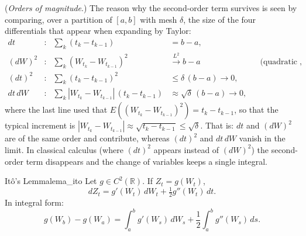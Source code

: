 \documentclass[11pt, a4paper]{article}
\begin{document}
\obs (\emph{Orders of magnitude}.) The reason why the second-order term survives is seen by
comparing, over a partition of $[a, b]$ with mesh $\delta$, the size of the four
differentials that appear when expanding by Taylor:
\begin{align*}
dt &: & \sum_k (t_k - t_{k-1}) &= b - a, \\
(dW)^2 &: & \sum_k (W_{t_k} - W_{t_{k-1}})^2 &\xrightarrow{L^2} b - a
&& \text{(quadratic variation)}, \\
(dt)^2 &: & \sum_k (t_k - t_{k-1})^2 &\le \delta \, (b - a) \longrightarrow 0, \\
dt \, dW &: & \sum_k |W_{t_k} - W_{t_{k-1}}| \, (t_k - t_{k-1}) &\approx \sqrt{\delta} \,
(b - a) \longrightarrow 0,
\end{align*}
where the last line used that $E((W_{t_k} - W_{t_{k-1}})^2) = t_k - t_{k-1}$, so that
the typical increment is $|W_{t_k} - W_{t_{k-1}}| \approx \sqrt{t_k - t_{k-1}} \le \sqrt{\delta}$.
That is: $dt$ and $(dW)^2$ are of the same order and contribute, whereas $(dt)^2$ and $dt \, dW$
vanish in the limit. In classical calculus (where $(dt)^2$ appears instead of $(dW)^2$) the
second-order term disappears and the change of variables keeps a single integral.

\begin{teorema}{Itô's Lemma}{lema_ito}
Let $g \in C^2(\mathbb{R})$. If $Z_t = g(W_t)$,
$$ dZ_t = g'(W_t) \, dW_t + \tfrac{1}{2} g''(W_t) \, dt. $$
In integral form:
$$ g(W_b) - g(W_a) = \int_a^b g'(W_s) \, dW_s + \frac{1}{2} \int_a^b g''(W_s) \, ds. $$
\end{teorema}
\end{document}
